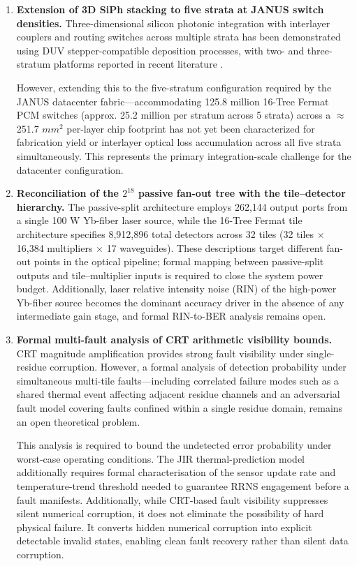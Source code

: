 \documentclass[journal]{IEEEtran}
\begin{document}
\begin{enumerate}
\item \textbf{Extension of 3D SiPh stacking to five strata at JANUS switch densities.} Three-dimensional silicon photonic integration with interlayer couplers and routing switches across multiple strata has been demonstrated using DUV stepper-compatible deposition processes, with two- and three-stratum platforms reported in recent literature \cite{Feldmann2019}. 

However, extending this to the five-stratum configuration required by the JANUS datacenter fabric---accommodating 125.8 million 16-Tree Fermat PCM switches (approx. 25.2 million per stratum across 5 strata) across a $\approx$251.7 $mm^{2}$ per-layer chip footprint has not yet been characterized for fabrication yield or interlayer optical loss accumulation across all five strata simultaneously. This represents the primary integration-scale challenge for the datacenter configuration.

\item \textbf{Reconciliation of the $2^{18}$ passive fan-out tree with the tile--detector hierarchy.} The passive-split architecture employs 262,144 output ports from a single 100 W Yb-fiber laser source, while the 16-Tree Fermat tile architecture specifies 8,912,896 total detectors across 32 tiles (32 tiles $\times$ 16,384 multipliers $\times$ 17 waveguides). These descriptions target different fan-out points in the optical pipeline; formal mapping between passive-split outputs and tile--multiplier inputs is required to close the system power budget. Additionally, laser relative intensity noise (RIN) of the high-power Yb-fiber source becomes the dominant accuracy driver in the absence of any intermediate gain stage, and formal RIN-to-BER analysis remains open.

\item \textbf{Formal multi-fault analysis of CRT arithmetic visibility bounds.} CRT magnitude amplification provides strong fault visibility under single-residue corruption. However, a formal analysis of detection probability under simultaneous multi-tile faults---including correlated failure modes such as a shared thermal event affecting adjacent residue channels and an adversarial fault model covering faults confined within a single residue domain, remains an open theoretical problem. 

This analysis is required to bound the undetected error probability under worst-case operating conditions. The JIR thermal-prediction model additionally requires formal characterisation of the sensor update rate and temperature-trend threshold needed to guarantee RRNS engagement before a fault manifests. Additionally, while CRT-based fault visibility suppresses silent numerical corruption, it does not eliminate the possibility of hard physical failure. It converts hidden numerical corruption into explicit detectable invalid states, enabling clean fault recovery rather than silent data corruption.
\end{enumerate}
\end{document}
